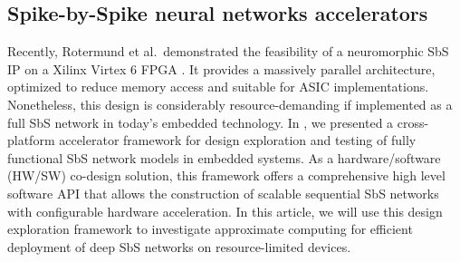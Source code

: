 \subsection{Spike-by-Spike neural networks accelerators}
Recently, Rotermund et al.\ demonstrated the feasibility of a neuromorphic SbS IP on a Xilinx Virtex 6 FPGA \cite{rotermund2018massively}. It provides a massively parallel architecture, optimized to reduce memory access and suitable for ASIC implementations. Nonetheless, this design is considerably resource-demanding if implemented as a full SbS network in today's embedded technology. In \cite{nevarez2020accelerator}, we presented a cross-platform accelerator framework for design exploration and testing of fully functional SbS network models in embedded systems. As a hardware/software (HW/SW) co-design solution, this framework offers a comprehensive high level software API that allows the construction of scalable sequential SbS networks with configurable hardware acceleration. In this article, we will use this design exploration framework to investigate approximate computing for efficient deployment of deep SbS networks on resource-limited devices.
